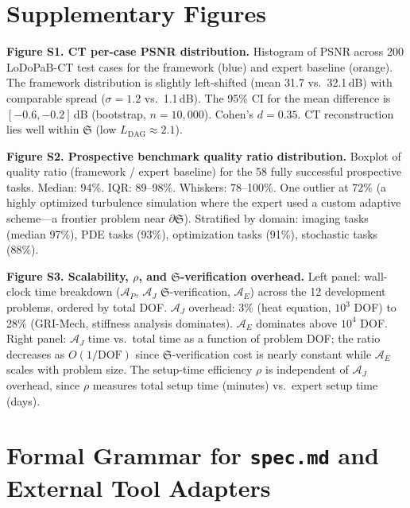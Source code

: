 \documentclass[11pt,a4paper]{article}
\newcommand{\Sclass}{\mathfrak{S}}
\newcommand{\Agent}{\mathcal{A}}
\begin{document}

\section*{Supplementary Figures}

\textbf{Figure S1. CT per-case PSNR distribution.} Histogram of PSNR across 200 LoDoPaB-CT test cases for the framework (blue) and expert baseline (orange). The framework distribution is slightly left-shifted (mean 31.7 vs.\ 32.1\,dB) with comparable spread ($\sigma = 1.2$ vs.\ 1.1\,dB). The 95\% CI for the mean difference is $[-0.6, -0.2]$\,dB (bootstrap, $n = 10{,}000$). Cohen's $d = 0.35$. CT reconstruction lies well within $\Sclass$ (low $L_{\text{DAG}} \approx 2.1$).

\textbf{Figure S2. Prospective benchmark quality ratio distribution.} Boxplot of quality ratio (framework / expert baseline) for the 58 fully successful prospective tasks. Median: 94\%. IQR: 89--98\%. Whiskers: 78--100\%. One outlier at 72\% (a highly optimized turbulence simulation where the expert used a custom adaptive scheme---a frontier problem near $\partial \Sclass$). Stratified by domain: imaging tasks (median 97\%), PDE tasks (93\%), optimization tasks (91\%), stochastic tasks (88\%).

\textbf{Figure S3. Scalability, $\rho$, and $\Sclass$-verification overhead.} Left panel: wall-clock time breakdown ($\Agent_P$, $\Agent_J$ $\Sclass$-verification, $\Agent_E$) across the 12 development problems, ordered by total DOF. $\Agent_J$ overhead: 3\% (heat equation, $10^3$ DOF) to 28\% (GRI-Mech, stiffness analysis dominates). $\Agent_E$ dominates above $10^4$ DOF. Right panel: $\Agent_J$ time vs.\ total time as a function of problem DOF; the ratio decreases as $O(1/\text{DOF})$ since $\Sclass$-verification cost is nearly constant while $\Agent_E$ scales with problem size. The setup-time efficiency $\rho$ is independent of $\Agent_J$ overhead, since $\rho$ measures total setup time (minutes) vs.\ expert setup time (days).


\section{Formal Grammar for \texttt{spec.md} and External Tool Adapters}
\label{sec:s8}
\end{document}
